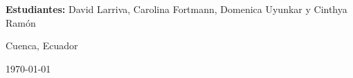 \begin{titlepage}
\begin{minipage}{0.85\textwidth}
\vspace{0.5cm}

\textbf{Estudiantes:}
David Larriva, Carolina Fortmann, Domenica Uyunkar y Cinthya Ramón

\end{minipage}


\vfill

{\normalsize
Cuenca, Ecuador
\par}

\vspace{0.2cm}

{\normalsize
\today
\par}

\vspace{0.3cm}

\end{titlepage}